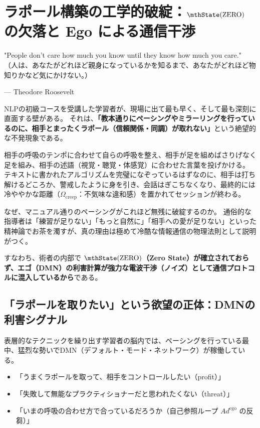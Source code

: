 \section{ラポール構築の工学的破綻：$\mthState(\mathrm{ZERO})$ の欠落と Ego による通信干渉}
\epigraph{"People don't care how much you know until they know how much you care."\\
\small（人は、あなたがどれほど親身になっているかを知るまで、あなたがどれほど物知りかなど気にかけない。）}{--- Theodore Roosevelt}

NLPの初級コースを受講した学習者が、現場に出て最も早く、そして最も深刻に直面する壁がある。
それは、\textbf{「教本通りにペーシングやミラーリングを行っているのに、相手とまったくラポール（信頼関係・同調）が取れない」}という絶望的な不発現象である。

相手の呼吸のテンポに合わせて自らの呼吸を整え、相手が足を組めばさりげなく足を組み、相手の述語（視覚・聴覚・体感覚）に合わせた言葉を投げかける。
テキストに書かれたアルゴリズムを完璧になぞっているはずなのに、相手は打ち解けるどころか、警戒したように身を引き、会話はぎこちなくなり、最終的には冷ややかな距離（$\Omega_{\mathrm{creep}}$：不気味な違和感）を置かれてセッションが終わる。

なぜ、マニュアル通りのペーシングがこれほど無残に破綻するのか。
通俗的な指導者は「練習が足りない」「もっと自然に」「相手への愛が足りない」といった精神論でお茶を濁すが、真の理由は極めて冷酷な情報通信の物理法則として説明がつく。

すなわち、術者の内部で \textbf{$\mthState(\mathrm{ZERO})$（Zero State）が確立されておらず、エゴ（DMN）の利害計算が強力な電波干渉（ノイズ）として通信プロトコルに混入しているから}である。

\subsection{「ラポールを取りたい」という欲望の正体：DMNの利害シグナル}
表層的なテクニックを繰り出す学習者の脳内では、ペーシングを行っている最中、猛烈な勢いでDMN（デフォルト・モード・ネットワーク）が稼働している。

\begin{itemize}
    \item 「うまくラポールを取って、相手をコントロールしたい（profit）」
    \item 「失敗して無能なプラクティショナーだと思われたくない（threat）」
    \item 「いまの呼吸の合わせ方で合っているだろうか（自己参照ループ $Ad^{\mathrm{ego}}$ の反芻）」
\end{itemize}

